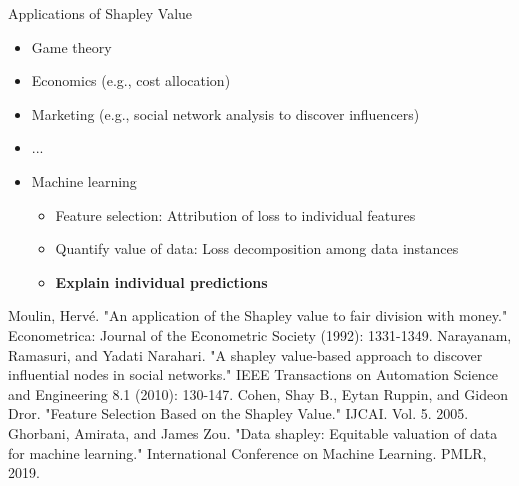 \documentclass[11pt,compress,t,notes=noshow, xcolor=table]{beamer}
\begin{document}
\begin{vbframe}{Applications of Shapley Value}

  \begin{itemize}
      \item Game theory
      \item Economics (e.g., cost allocation) 
      \item Marketing (e.g., social network analysis to discover influencers) 
      \item ...
      \item Machine learning
       \begin{itemize}
         \item Feature selection: Attribution of loss to individual features
         \item Quantify value of data: Loss decomposition among data instances 
         \item \textbf{Explain individual predictions}
       \end{itemize}
  \end{itemize}

  \tiny{Moulin, Hervé. "An application of the Shapley value to fair division with money." Econometrica: Journal of the Econometric Society (1992): 1331-1349.}
  \tiny{Narayanam, Ramasuri, and Yadati Narahari. "A shapley value-based approach to discover influential nodes in social networks." IEEE Transactions on Automation Science and Engineering 8.1 (2010): 130-147.}
  \tiny{Cohen, Shay B., Eytan Ruppin, and Gideon Dror. "Feature Selection Based on the Shapley Value." IJCAI. Vol. 5. 2005.}
  \tiny{Ghorbani, Amirata, and James Zou. "Data shapley: Equitable valuation of data for machine learning." International Conference on Machine Learning. PMLR, 2019.}
\end{vbframe}

\endlecture
\end{document}
